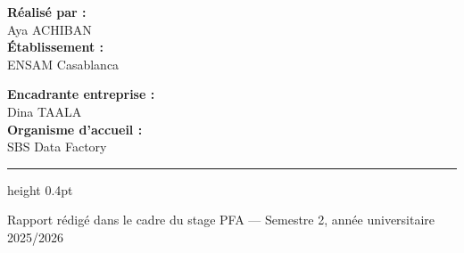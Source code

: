 \begin{titlepage}
\begin{center}
\begin{minipage}{0.44\textwidth}
  \raggedright
  {\bfseries\color{sbsnavy} Réalisé par :}\\[0.15cm]
  Aya ACHIBAN\\[0.6cm]
  {\bfseries\color{sbsnavy} Établissement :}\\[0.15cm]
  ENSAM Casablanca
\end{minipage}\hfill
\begin{minipage}{0.44\textwidth}
  \raggedleft
  {\bfseries\color{sbsnavy} Encadrante entreprise :}\\[0.15cm]
  Dina TAALA\\[0.6cm]
  {\bfseries\color{sbsnavy} Organisme d'accueil :}\\[0.15cm]
  SBS Data Factory
\end{minipage}

\vfill

{\color{sbsnavy}\hrule height 0.4pt}
\vspace{0.3cm}
{\small\color{sbsgray} Rapport rédigé dans le cadre du stage PFA --- Semestre 2, année universitaire 2025/2026}
\end{center}
\end{titlepage}
